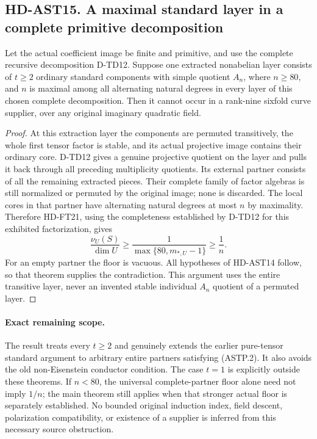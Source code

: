 \subsection*{HD-AST15. A maximal standard layer in a complete primitive decomposition}

\begin{corollary}[HD-AST15]
Let the actual coefficient image be finite and primitive, and use
the complete recursive decomposition D-TD12.  Suppose one extracted
nonabelian layer consists of $t\ge2$ ordinary standard components
with simple quotient $A_n$, where $n\ge80$, and $n$ is maximal
among all alternating natural degrees in every layer of this chosen
complete decomposition.  Then it cannot occur in a rank-nine
sixfold curve supplier, over any original imaginary quadratic field.
\end{corollary}

\begin{proof}
At this extraction layer the components are permuted transitively,
the whole first tensor factor is stable, and its actual projective
image contains their ordinary core.  D-TD12 gives a genuine
projective quotient on the layer and pulls it back through all
preceding multiplicity quotients.  Its external partner consists
of all the remaining extracted pieces.  Their complete family of
factor algebras is still normalized or permuted by the original
image; none is discarded.  The local cores in that partner have
alternating natural degrees at most $n$ by maximality.  Therefore
HD-FT21, using the completeness established by D-TD12 for this
exhibited factorization, gives
\[
 \frac{\nu_U(S)}{\dim U}
       \ge\frac1{\max\{80,m_{*,U}-1\}}\ge\frac1n.
 \tag{ASTP.14}
\]
For an empty partner the floor is vacuous.  All hypotheses of
HD-AST14 follow, so that theorem supplies the contradiction.
This argument uses the entire transitive layer, never an invented
stable individual $A_n$ quotient of a permuted layer.
\end{proof}

\paragraph{Exact remaining scope.}
The result treats every $t\ge2$ and genuinely extends the earlier
pure-tensor standard argument to arbitrary entire partners satisfying
(ASTP.2).  It also avoids the old non-Eisenstein conductor condition.
The case $t=1$ is explicitly outside these theorems.  If $n<80$, the
universal complete-partner floor alone need not imply $1/n$; the
main theorem still applies when that stronger actual floor is
separately established.  No bounded original induction index, field
descent, polarization compatibility, or existence of a supplier is
inferred from this necessary source obstruction.
